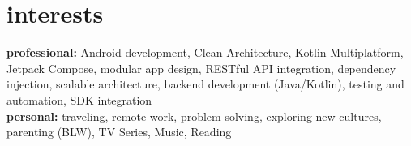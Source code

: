 \documentclass[a4paper,nocolors]{cv-friggeri-x}
\begin{document}

\section{interests}

\textbf{professional:} Android development, Clean Architecture, Kotlin Multiplatform, Jetpack Compose, modular app design, RESTful API integration, dependency injection, scalable architecture, backend development (Java/Kotlin), testing and automation, SDK integration \\
\textbf{personal:} traveling, remote work, problem-solving, exploring new cultures, parenting (BLW), TV Series, Music, Reading
 
\end{document}
